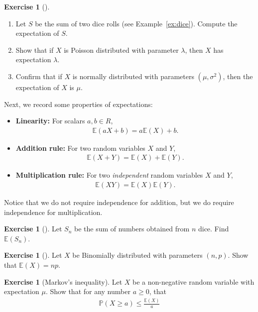 \documentclass[11pt]{article}
\theoremstyle{definition}
\newtheorem{exercise}[]{Exercise}
\renewcommand{\P}{\mathbb{P}}
\newcommand{\E}{\mathbb{E}}
\begin{document}
\begin{exercise}[]
  $\;$\vspace{-1em}

  \begin{enumerate}[label = (\alph*)]
    \item Let $S$ be the sum of two dice rolls (see Example~\ref{ex:dice}). Compute
    the expectation of $S$.
    \item Show that if $X$ is Poisson distributed with parameter $\lambda$, then
    $X$ has expectation $\lambda$.
    \item Confirm that if $X$ is normally distributed with parameters $(\mu, \sigma^2)$,
    then the expectation of $X$ is $\mu$.
  \end{enumerate}
\end{exercise}

Next, we record some properties of expectations:
\begin{itemize}
  \item {\bf Linearity: } For scalars $a, b\in R$,
  \begin{align*}
    \E(aX + b) = a\E(X) + b.
  \end{align*}
  \item {\bf Addition rule: } For two random variables $X$ and $Y$,
  \begin{align*}
    \E(X + Y) = \E(X) + \E(Y).
  \end{align*}
  \item {\bf Multiplication rule: } For two \textit{independent}
  random variables $X$ and $Y$,
  \begin{align*}
    \E(XY) = \E(X)\E(Y).
  \end{align*}
\end{itemize}
Notice that we do not require independence for addition, but we do require
independence for multiplication.

\begin{exercise}[]
  Let $S_n$ be the sum of numbers obtained from $n$ dice. Find $\E(S_n)$.
\end{exercise}

\begin{exercise}[]
  Let $X$ be Binomially distributed with parameters $(n, p)$.
  Show that $\E(X) = np$.
\end{exercise}

\begin{exercise}[Markov's inequality]
  Let $X$ be a non-negative random variable with expectation $\mu$.
  Show that for any number $a \geq 0$, that
  \begin{align}
    \P(X \geq a) \leq \frac{\E(X)}{a}
    \label{eq:markov}
  \end{align}
\end{exercise}
\end{document}
